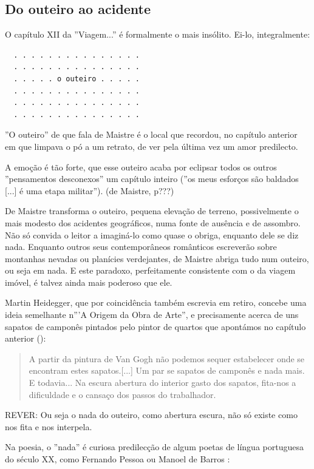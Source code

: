 \documentclass[12pt]{article}
\begin{document}
\subsection{Do outeiro ao acidente}

O capítulo XII da ''Viagem...'' é formalmente o mais insólito. Ei-lo,
integralmente:

\begin{verbatim}
  . . . . . . . . . . . . . . .
  . . . . . . . . . . . . . . .
  . . . . . o outeiro . . . . .
  . . . . . . . . . . . . . . .
  . . . . . . . . . . . . . . .
  . . . . . . . . . . . . . . .
\end{verbatim}

''O outeiro'' de que fala de Maistre é o local que recordou, no
capítulo anterior em que limpava o pó a um retrato, de ver pela última
vez um amor predilecto.

A emoção é tão forte, que esse outeiro acaba por eclipsar todos os
outros ''pensamentos desconexos'' um capítulo inteiro (''os meus
esforços são baldados [...] é uma etapa militar''). (de Maistre, p???)

De Maistre transforma o outeiro, pequena elevação de terreno,
possivelmente o mais modesto dos acidentes geográficos, numa fonte de
ausência e de assombro. Não só convida o leitor a imaginá-lo como
quase o obriga, enquanto dele se diz nada. Enquanto outros seus
contemporâneos românticos escreverão sobre montanhas nevadas ou
planícies verdejantes, de Maistre abriga tudo num outeiro, ou seja em
nada. E este paradoxo, perfeitamente consistente com o da viagem
imóvel, é talvez ainda mais poderoso que ele.

Martin Heidegger, que por coincidência também escrevia em retiro,
concebe uma ideia semelhante n'''A Origem da Obra de Arte'', e
precisamente acerca de uns sapatos de camponês pintados pelo pintor de
quartos que apontámos no capítulo anterior (\cite[p.24]{heidegger}):

\begin{quote}
  A partir da pintura de Van Gogh não podemos sequer estabelecer onde
  se encontram estes sapatos.[...] Um par se sapatos de camponês e
  nada mais. E todavia...  Na escura abertura do interior gasto dos
  sapatos, fita-nos a dificuldade e o cansaço dos passos do
  trabalhador.
\end{quote} 

REVER: Ou seja o nada do outeiro, como abertura escura, não só existe como
nos fita e nos interpela.

Na poesia, o ''nada'' é curiosa predilecção de algum poetas de língua
portuguesa do século XX, como Fernando Pessoa ou Manoel de Barros
\cite{manoel}:
\end{document}
